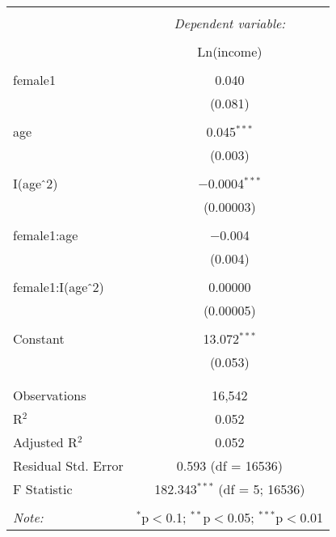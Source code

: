 
\begin{table}[!htbp] \centering 
  \caption{} 
  \label{} 
\begin{tabular}{@{\extracolsep{5pt}}lc} 
\\[-1.8ex]\hline 
\hline \\[-1.8ex] 
 & \multicolumn{1}{c}{\textit{Dependent variable:}} \\ 
\cline{2-2} 
\\[-1.8ex] & Ln(income) \\ 
\hline \\[-1.8ex] 
 female1 & 0.040 \\ 
  & (0.081) \\ 
  & \\ 
 age & 0.045$^{***}$ \\ 
  & (0.003) \\ 
  & \\ 
 I(age$\hat{\mkern6mu}$2) & $-$0.0004$^{***}$ \\ 
  & (0.00003) \\ 
  & \\ 
 female1:age & $-$0.004 \\ 
  & (0.004) \\ 
  & \\ 
 female1:I(age$\hat{\mkern6mu}$2) & 0.00000 \\ 
  & (0.00005) \\ 
  & \\ 
 Constant & 13.072$^{***}$ \\ 
  & (0.053) \\ 
  & \\ 
\hline \\[-1.8ex] 
Observations & 16,542 \\ 
R$^{2}$ & 0.052 \\ 
Adjusted R$^{2}$ & 0.052 \\ 
Residual Std. Error & 0.593 (df = 16536) \\ 
F Statistic & 182.343$^{***}$ (df = 5; 16536) \\ 
\hline 
\hline \\[-1.8ex] 
\textit{Note:}  & \multicolumn{1}{r}{$^{*}$p$<$0.1; $^{**}$p$<$0.05; $^{***}$p$<$0.01} \\ 
\end{tabular} 
\end{table} 
